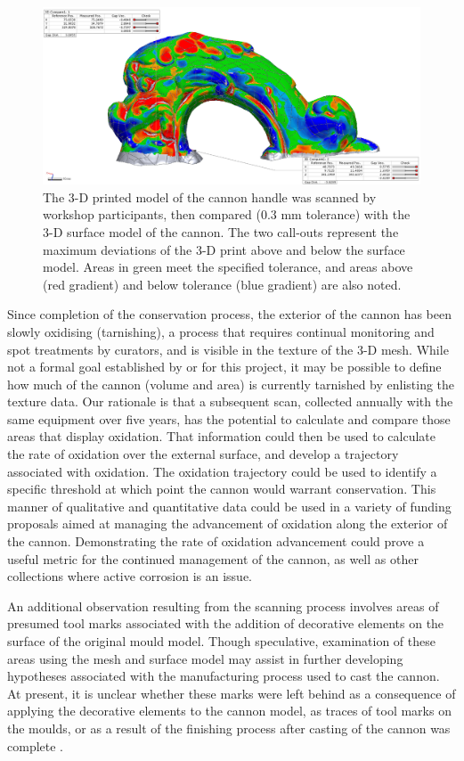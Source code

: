 \documentclass[review]{elsarticle}
\begin{document}
\begin{figure}[ht]\centering
\includegraphics[width=\linewidth]{fig08.png}
\caption{The 3-D printed model of the cannon handle was scanned by workshop participants, then compared (0.3 mm tolerance) with the 3-D surface model of the cannon. The two call-outs represent the maximum deviations of the 3-D print above and below the surface model. Areas in green meet the specified tolerance, and areas above (red gradient) and below tolerance (blue gradient) are also noted.}
\label{fig:fig08}
\end{figure}

Since completion of the conservation process, the exterior of the cannon has been slowly oxidising (tarnishing), a process that requires continual monitoring and spot treatments by curators, and is visible in the texture of the 3-D mesh. While not a formal goal established by or for this project, it may be possible to define how much of the cannon (volume and area) is currently tarnished by enlisting the texture data. Our rationale is that a subsequent scan, collected annually with the same equipment over five years, has the potential to calculate and compare those areas that display oxidation. That information could then be used to calculate the rate of oxidation over the external surface, and develop a trajectory associated with oxidation. The oxidation trajectory could be used to identify a specific threshold at which point the cannon would warrant conservation. This manner of qualitative and quantitative data could be used in a variety of funding proposals aimed at managing the advancement of oxidation along the exterior of the cannon. Demonstrating the rate of oxidation advancement could prove a useful metric for the continued management of the cannon, as well as other collections where active corrosion is an issue.

An additional observation resulting from the scanning process involves areas of presumed tool marks associated with the addition of decorative elements on the surface of the original mould model. Though speculative, examination of these areas using the mesh and surface model may assist in further developing hypotheses associated with the manufacturing process used to cast the cannon. At present, it is unclear whether these marks were left behind as a consequence of applying the decorative elements to the cannon model, as traces of tool marks on the moulds, or as a result of the finishing process after casting of the cannon was complete \cite[358]{RN5763}.
\end{document}
